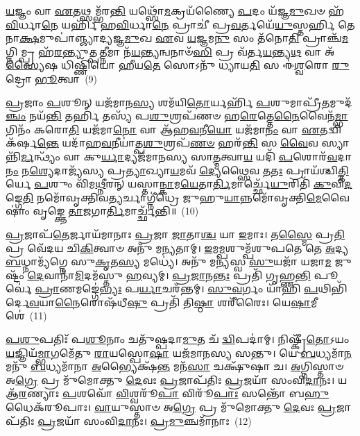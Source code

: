 {\anuvakamend[{\-\ul{𑌏}\-𑌵 𑌤𑌿᳴𑌷𑍍𑌠\-\ul{𑌤𑌿} 𑌯𑍋 𑌵𑌾᳴\-\ul{𑌯}\-𑌵𑍍𑌯᳴𑌮\-\ul{𑌸𑍍𑌯} 𑌗𑍍𑌰\-\ul{𑌹𑌂} 𑌵𑍈\-\ul{𑌕𑌾}\-𑌨𑍍𑌨𑌵𑌿𑍞᳴\-\ul{𑌶}\-𑌤𑌿𑌶𑍍𑌚᳴}]}%

\-\ul{𑌯}\-𑌜𑍍𑌞𑌂 𑌵𑌾 \ul{𑌏}\-𑌤𑌥𑍍𑌸𑌮𑍍𑌭᳴𑌰\-\ul{𑌨𑍍𑌤𑌿} 𑌯𑌥𑍍𑌸𑍋᳴\-\ul{𑌮}\-𑌕𑍍𑌰𑌯᳴𑌣𑍍𑌯𑍈 \ul{𑌪}\-𑌦𑌂 𑌯᳴𑌜𑍍𑌞\-\ul{𑌮𑍁}\-𑌖𑍞 𑌹᳴\-\ul{𑌵𑌿}\-𑌰𑍍𑌧𑌾\-\ul{𑌨𑍇} 𑌯𑌰𑍍\mbox{}𑌹𑌿᳴ 𑌹\-\ul{𑌵𑌿}\-𑌰𑍍𑌧𑌾\-\ul{𑌨𑍇} 𑌪𑍍𑌰𑌾𑌚𑍀॑ 𑌪𑍍𑌰\-\ul{𑌵}\-𑌰𑍍𑌤𑌯𑍇᳴\-\ul{𑌯𑍁}\-𑌸𑍍𑌤𑌰𑍍\mbox{}\-\ul{𑌹𑌿} 𑌤𑍇𑌨𑌾\-\ul{𑌕𑍍𑌷}\-𑌮𑍁𑌪𑌾॑𑌞𑍍𑌜𑍍𑌯𑌾𑌦𑍍𑌯𑌜𑍍𑌞\-\ul{𑌮𑍁}\-𑌖 \ul{𑌏}\-𑌵 \ul{𑌯}\-𑌜𑍍𑌞𑌮\-\ul{𑌨𑍁} 𑌸𑌂 𑌤᳴𑌨𑍋\-\ul{𑌤𑌿} 𑌪𑍍𑌰𑌾𑌞𑍍𑌚᳴\-\ul{𑌮}\-𑌗𑍍𑌨𑌿𑌮𑍍𑌪𑍍𑌰 𑌹᳴\-\ul{𑌰}\-𑌨𑍍𑌤𑍍𑌯𑍁𑌤𑍍𑌪\-\ul{𑌤𑍍𑌨𑍀}\-𑌮𑌾 𑌨᳴\-\ul{𑌯}\-𑌨𑍍𑌤𑍍𑌯𑌨𑍍𑌵𑌨𑌾𑍞᳴\-\ul{𑌸𑌿} 𑌪𑍍𑌰 𑌵᳴𑌰𑍍𑌤\-\ul{𑌯}\-𑌨𑍍𑌤𑍍𑌯\-\ul{𑌥} 𑌵𑌾 𑌅᳴\-\ul{𑌸𑍍𑌯𑍈}\-𑌷 𑌧𑌿𑌷𑍍𑌣𑌿᳴𑌯𑍋 𑌹𑍀𑌯\-\ul{𑌤𑍇} 𑌸𑍋\-𑌽𑌨𑍁᳴ 𑌧𑍍𑌯𑌾𑌯\-\ul{𑌤𑌿} 𑌸 𑌈॑\-\ul{𑌶𑍍𑌵}\-𑌰𑍋 \ul{𑌰𑍁}\-𑌦𑍍𑌰𑍋 \ul{𑌭𑍂}\-𑌤𑍍𑌵𑌾~(9)

\-\ul{𑌪𑍍𑌰}\-𑌜𑌾𑌂 \ul{𑌪}\-𑌶𑍂𑌨𑍍 𑌯𑌜᳴𑌮𑌾𑌨\-\ul{𑌸𑍍𑌯} 𑌶𑌮᳴𑌯𑌿\-\ul{𑌤𑍋}\-𑌰𑍍𑌯𑌰𑍍\mbox{}𑌹𑌿᳴ \ul{𑌪}\-𑌶𑍁𑌮𑌾𑌪𑍍𑌰𑍀᳴\-\ul{𑌤}\-𑌮𑍁𑌦᳴\-\ul{𑌞𑍍𑌚𑌂} 𑌨𑌯᳴\-\ul{𑌨𑍍𑌤𑌿} 𑌤𑌰𑍍\mbox{}\-\ul{𑌹𑌿} 𑌤𑌸𑍍𑌯᳴ 𑌪\-\ul{𑌶𑍁}\-𑌶𑍍𑌰𑌪᳴𑌣𑍞 𑌹\-\ul{𑌰𑍇}\-𑌤𑍍𑌤𑍇\-\ul{𑌨𑍈}\-𑌵𑍈𑌨᳴\-\ul{𑌮𑍍𑌭𑌾}\-𑌗𑌿𑌨𑌂᳴ 𑌕𑌰𑍋\-\ul{𑌤𑌿} 𑌯𑌜᳴𑌮𑌾\-\ul{𑌨𑍋} 𑌵𑌾 𑌆᳴𑌹\-\ul{𑌵}\-𑌨𑍀\-\ul{𑌯𑍋} 𑌯𑌜᳴𑌮𑌾\-\ul{𑌨𑌂} 𑌵𑌾 \ul{𑌏}\-𑌤𑌦𑍍𑌵𑌿 𑌕᳴𑌰𑍍\mbox{}𑌷\-\ul{𑌨𑍍𑌤𑍇} 𑌯𑌦𑌾᳴𑌹\-\ul{𑌵}\-𑌨𑍀𑌯𑌾॑𑌤𑍍𑌪\-\ul{𑌶𑍁}\-𑌶𑍍𑌰𑌪᳴\-\ul{𑌣}\-\-\ul{𑍞} 𑌹𑌰᳴\-\ul{𑌨𑍍𑌤𑌿} 𑌸 \ul{𑌵𑍈}\-𑌵 𑌸𑍍𑌯𑌾𑌨𑍍𑌨𑌿᳴\-\ul{𑌰𑍍𑌮}\-𑌨𑍍𑌥𑍍𑌯𑌂᳴ 𑌵𑌾 𑌕𑍁\-\ul{𑌰𑍍𑌯𑌾}\-𑌦𑍍𑌯𑌜᳴𑌮𑌾𑌨𑌸𑍍𑌯 𑌸𑌾\-\ul{𑌤𑍍𑌮}\-𑌤𑍍𑌵𑌾\-\ul{𑌯} 𑌯𑌦𑌿᳴ \ul{𑌪}\-𑌶𑍋𑌰᳴\-\ul{𑌵}\-𑌦𑌾\-\ul{𑌨𑌂} 𑌨\-\ul{𑌶𑍍𑌯𑍇}\-𑌦𑌾𑌜𑍍𑌯᳴𑌸𑍍𑌯 𑌪𑍍𑌰\-\ul{𑌤𑍍𑌯𑌾}\-𑌖𑍍𑌯𑌾\-\ul{𑌯}\-𑌮𑌵᳴ \ul{𑌦𑍍𑌯𑍇}\-𑌥𑍍𑌸𑍈𑌵 𑌤\-\ul{𑌤𑌃} 𑌪𑍍𑌰𑌾𑌯᳴𑌶𑍍𑌚𑌿\-\ul{𑌤𑍍𑌤𑌿}\-𑌰𑍍𑌯𑍇 \ul{𑌪}\-𑌶𑍁𑌂 𑌵𑌿᳴𑌮\-\ul{𑌥𑍍𑌨𑍀}\-𑌰𑌨𑍍 𑌯𑌸𑍍𑌤𑌾\-\ul{𑌨𑍍𑌕𑌾}\-𑌮\-\ul{𑌯𑍇}\-𑌤𑌾\-\ul{𑌰𑍍𑌤𑌿}\-𑌮𑌾𑌰𑍍𑌚𑍍𑌛𑍇᳴\-\ul{𑌯𑍁}\-𑌰𑌿𑌤𑌿᳴ \ul{𑌕𑍁}\-𑌵𑌿\-\ul{𑌦}\-𑌙𑍍𑌗𑍇\-\ul{𑌤𑌿} 𑌨𑌮𑍋᳴𑌵𑍃𑌕𑍍𑌤𑌿𑌵\-\ul{𑌤𑍍𑌯}\-𑌰𑍍𑌚𑌾𑌗𑍍𑌨𑍀॑𑌧𑍍𑌰𑍇 𑌜𑍁𑌹𑍁\-\ul{𑌯𑌾}\-𑌨𑍍𑌨𑌮𑍋᳴𑌵𑍃𑌕𑍍𑌤𑌿\-\ul{𑌮𑍇}\-𑌵𑍈𑌷𑌾𑌂॑ 𑌵𑍃𑌙𑍍𑌕𑍍𑌤𑍇 \ul{𑌤𑌾}\-𑌜𑌗𑌾\-\ul{𑌰𑍍𑌤𑌿}\-𑌮𑌾𑌰𑍍𑌚𑍍𑌛᳴𑌨𑍍𑌤𑌿॥~(10)

{\anuvakamend[{\-\ul{𑌭𑍂}\-𑌤𑍍𑌵𑌾 𑌤\-\ul{𑌤𑌃} 𑌷𑌡𑍍𑌵𑌿𑍞᳴𑌶𑌤𑌿𑌶𑍍𑌚}]}%

\-\ul{𑌪𑍍𑌰}\-𑌜𑌾𑌪᳴\-\ul{𑌤𑍇}\-𑌰𑍍𑌜𑌾𑌯᳴𑌮𑌾𑌨𑌾𑌃 \ul{𑌪𑍍𑌰}\-𑌜𑌾 \ul{𑌜𑌾}\-𑌤𑌾\-\ul{𑌶𑍍𑌚} 𑌯𑌾 \ul{𑌇}\-𑌮𑌾𑌃। 𑌤\-\ul{𑌸𑍍𑌮𑍈} 𑌪𑍍𑌰\-\ul{𑌤𑌿} 𑌪𑍍𑌰 𑌵𑍇᳴𑌦𑌯 𑌚𑌿\-\ul{𑌕𑌿}\-𑌤𑍍𑌵𑌾𑍞 𑌅𑌨𑍁᳴ 𑌮𑌨𑍍𑌯𑌤𑌾𑌮𑍍। \ul{𑌇}\-𑌮\-\ul{𑌮𑍍𑌪}\-𑌶𑍁𑌮𑍍𑌪᳴𑌶𑍁𑌪𑌤𑍇 𑌤𑍇 \ul{𑌅}\-𑌦𑍍𑌯 \ul{𑌬}\-𑌧𑍍𑌨𑌾𑌮𑍍𑌯᳴𑌗𑍍𑌨𑍇 𑌸𑍁\-\ul{𑌕𑍃}\-𑌤\-\ul{𑌸𑍍𑌯} 𑌮𑌧𑍍𑌯𑍇॑। 𑌅𑌨𑍁᳴ 𑌮𑌨𑍍𑌯𑌸𑍍𑌵 \ul{𑌸𑍁}\-𑌯𑌜𑌾᳴ 𑌯𑌜𑌾\-\ul{𑌮} 𑌜𑍁𑌷𑍍𑌟𑌂᳴ \ul{𑌦𑍇}\-𑌵𑌾𑌨𑌾᳴\-\ul{𑌮𑌿}\-𑌦𑌮᳴𑌸𑍍𑌤𑍁 \ul{𑌹}\-𑌵𑍍𑌯𑌮𑍍। \ul{𑌪𑍍𑌰}\-\-\ul{𑌜𑌾}\-𑌨\-\ul{𑌨𑍍𑌤𑌃} 𑌪𑍍𑌰𑌤𑌿᳴ 𑌗𑍃𑌹𑍍𑌣\-\ul{𑌨𑍍𑌤𑌿} 𑌪𑍂𑌰𑍍𑌵𑍇॑ \ul{𑌪𑍍𑌰𑌾}\-𑌣𑌮𑌙𑍍𑌗𑍇॑\-\ul{𑌭𑍍𑌯𑌃} 𑌪\-\ul{𑌰𑍍𑌯𑌾}\-𑌚𑌰᳴𑌨𑍍𑌤𑌮𑍍। \ul{𑌸𑍁}\-\-\ul{𑌵}\-𑌰𑍍𑌗𑌂 𑌯𑌾᳴𑌹𑌿 \ul{𑌪}\-𑌥𑌿𑌭𑌿᳴𑌰𑍍𑌦𑍇\-\ul{𑌵}\-𑌯𑌾\-\ul{𑌨𑍈}\-𑌰𑍋𑌷᳴𑌧𑍀\-\ul{𑌷𑍁} 𑌪𑍍𑌰𑌤𑌿᳴ 𑌤𑌿\-\ul{𑌷𑍍𑌠𑌾} 𑌶𑌰𑍀᳴𑌰𑍈𑌃। 𑌯𑍇\-\ul{𑌷𑌾}\-𑌮𑍀𑌶𑍇॑~(11)

\-\ul{𑌪}\-\-\ul{𑌶𑍁}\-𑌪𑌤𑌿𑌃᳴ 𑌪\-\ul{𑌶𑍂}\-𑌨𑌾𑌂 𑌚𑌤𑍁᳴𑌷𑍍𑌪𑌦𑌾\-\ul{𑌮𑍁}\-𑌤 𑌚᳴ \ul{𑌦𑍍𑌵𑌿}\-𑌪𑌦𑌾॑𑌮𑍍। 𑌨𑌿𑌷𑍍𑌕𑍍𑌰𑍀᳴\-\ul{𑌤𑍋}\-\-𑌽𑌯𑌂 \ul{𑌯}\-𑌜𑍍𑌞𑌿𑌯᳴\-\ul{𑌮𑍍𑌭𑌾}\-𑌗𑌮𑍇᳴𑌤𑍁 \ul{𑌰𑌾}\-𑌯𑌸𑍍𑌪𑍋\-\ul{𑌷𑌾} 𑌯𑌜᳴𑌮𑌾𑌨𑌸𑍍𑌯 𑌸𑌨𑍍𑌤𑍁। 𑌯𑍇 \ul{𑌬}\-𑌧𑍍𑌯𑌮𑌾᳴\-\ul{𑌨}\-𑌮𑌨𑍁᳴ \ul{𑌬}\-𑌧𑍍𑌯𑌮𑌾᳴𑌨𑌾 \ul{𑌅}\-𑌭𑍍𑌯𑍈𑌕𑍍𑌷᳴\-\ul{𑌨𑍍𑌤} 𑌮𑌨᳴\-\ul{𑌸𑌾} 𑌚𑌕𑍍𑌷𑍁᳴𑌷𑌾 𑌚। \ul{𑌅}\-𑌗𑍍𑌨𑌿𑌸𑍍𑌤𑌾𑍞 𑌅\-\ul{𑌗𑍍𑌰𑍇} 𑌪𑍍𑌰 𑌮𑍁᳴𑌮𑍋𑌕𑍍𑌤𑍁 \ul{𑌦𑍇}\-𑌵𑌃 \ul{𑌪𑍍𑌰}\-𑌜𑌾𑌪᳴𑌤𑌿𑌃 \ul{𑌪𑍍𑌰}\-𑌜𑌯𑌾᳴ 𑌸𑌂𑌵𑌿\-\ul{𑌦𑌾}\-𑌨𑌃। 𑌯 𑌆᳴\-\ul{𑌰}\-𑌣𑍍𑌯𑌾𑌃 \ul{𑌪}\-𑌶𑌵𑍋᳴ \ul{𑌵𑌿}\-𑌶𑍍𑌵𑌰𑍂᳴\-\ul{𑌪𑌾} 𑌵𑌿𑌰𑍂᳴\-\ul{𑌪𑌾𑌃} 𑌸𑌨𑍍𑌤𑍋᳴ 𑌬\-\ul{𑌹𑍁}\-𑌧𑍈𑌕᳴𑌰𑍂𑌪𑌾𑌃। \ul{𑌵𑌾}\-𑌯𑍁𑌸𑍍𑌤𑌾𑍞 𑌅\-\ul{𑌗𑍍𑌰𑍇} 𑌪𑍍𑌰 𑌮𑍁᳴𑌮𑍋𑌕𑍍𑌤𑍁 \ul{𑌦𑍇}\-𑌵𑌃 \ul{𑌪𑍍𑌰}\-𑌜𑌾𑌪᳴𑌤𑌿𑌃 \ul{𑌪𑍍𑌰}\-𑌜𑌯𑌾᳴ 𑌸𑌂𑌵𑌿\-\ul{𑌦𑌾}\-𑌨𑌃। \ul{𑌪𑍍𑌰}\-\-\ul{𑌮𑍁}\-𑌞𑍍𑌚𑌮𑌾᳴𑌨𑌾𑌃~(12)

